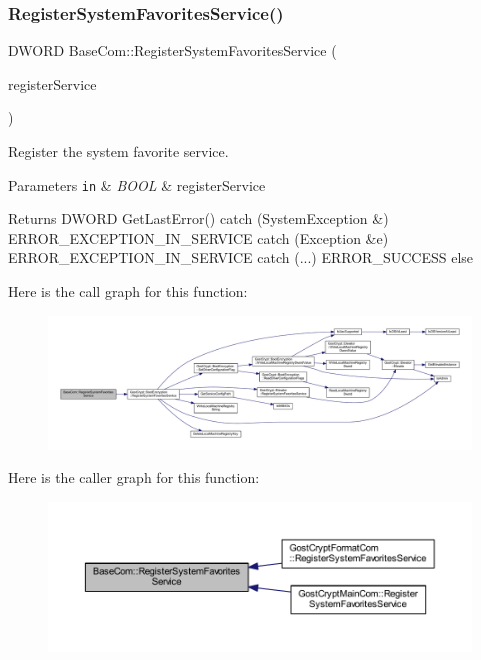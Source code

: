 \subsubsection{\texorpdfstring{Register\+System\+Favorites\+Service()}{RegisterSystemFavoritesService()}}
{\footnotesize\ttfamily D\+W\+O\+RD Base\+Com\+::\+Register\+System\+Favorites\+Service (\begin{DoxyParamCaption}\item[{B\+O\+OL}]{register\+Service }\end{DoxyParamCaption})\hspace{0.3cm}{\ttfamily [static]}}



Register the system favorite service. 


\begin{DoxyParams}[1]{Parameters}
\mbox{\tt in}  & {\em B\+O\+OL} & register\+Service \\
\hline
\end{DoxyParams}
\begin{DoxyReturn}{Returns}
D\+W\+O\+RD Get\+Last\+Error() catch (System\+Exception \&) E\+R\+R\+O\+R\+\_\+\+E\+X\+C\+E\+P\+T\+I\+O\+N\+\_\+\+I\+N\+\_\+\+S\+E\+R\+V\+I\+CE catch (Exception \&e) E\+R\+R\+O\+R\+\_\+\+E\+X\+C\+E\+P\+T\+I\+O\+N\+\_\+\+I\+N\+\_\+\+S\+E\+R\+V\+I\+CE catch (...) E\+R\+R\+O\+R\+\_\+\+S\+U\+C\+C\+E\+SS else 
\end{DoxyReturn}
Here is the call graph for this function\+:
\nopagebreak
\begin{figure}[H]
\begin{center}
\leavevmode
\includegraphics[width=350pt]{class_base_com_aa5bd0c7ed2b559f9be436622febb3dfb_cgraph}
\end{center}
\end{figure}
Here is the caller graph for this function\+:
\nopagebreak
\begin{figure}[H]
\begin{center}
\leavevmode
\includegraphics[width=350pt]{class_base_com_aa5bd0c7ed2b559f9be436622febb3dfb_icgraph}
\end{center}
\end{figure}
